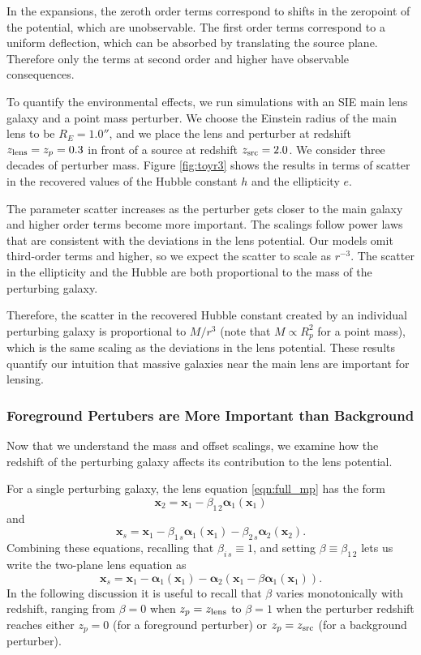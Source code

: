 \documentclass{emulateapj}
\newcommand\x[0]{\mathbf{x}}
\newcommand\al[0]{\boldsymbol{\alpha}}
\begin{document}
In the expansions, the zeroth order terms correspond to shifts in the zeropoint of the potential, which are unobservable.  The first order terms correspond to a uniform deflection, which can be absorbed by translating the source plane.  Therefore only the terms at second order and higher have observable consequences.

To quantify the environmental effects, we run simulations with an SIE main lens galaxy and a point mass perturber.  We choose the Einstein radius of the main lens to be $R_E = 1.0''$, and we place the lens and perturber at redshift $z_{\rm{lens}} = z_p = 0.3$ in front of a source at redshift $z_{\rm{src}} = 2.0$.  We consider three decades of perturber mass.  Figure \ref{fig:toyr3} shows the results in terms of scatter in the recovered values of the Hubble constant $h$ and the ellipticity $e$.

The parameter scatter increases as the perturber gets closer to the main galaxy and higher order terms become more important.  The scalings follow power laws that are consistent with the deviations in the lens potential. Our models omit third-order terms and higher, so we expect the scatter to scale as $r^{-3}$. The scatter in the ellipticity and the Hubble are both proportional to the mass of the perturbing galaxy. 

Therefore, the scatter in the recovered Hubble constant created by an individual perturbing galaxy is proportional to $M / r^3$ (note that $ M \propto R_p^2$ for a point mass), which is the same scaling as the deviations in the lens potential. These results quantify our intuition that massive galaxies near the main lens are important for lensing.


\subsubsection{Foreground Pertubers are More Important than Background}
\label{sec:frontback}

Now that we understand the mass and offset scalings, we examine how the redshift of the perturbing galaxy affects its contribution to the lens potential. 

For a single perturbing galaxy, the lens equation \ref{eqn:full_mp} has the form
\begin{equation}
\x_2 = \x_1 - \beta_{1\,2} \al_1(\x_1)
\end{equation}
and
\begin{equation}
\x_s = \x_1 - \beta_{1\,s} \al_1(\x_1) - \beta_{2\,s} \al_2(\x_2).
\end{equation}
Combining these equations, recalling that $\beta_{i\,s} \equiv 1$, and setting $\beta \equiv \beta_{1\,2}$ lets us write the two-plane lens equation as
\begin{equation}
\x_s = \x_1 - \al_1(\x_1) - \al_2\left(\x_1 - \beta \al_1(\x_1)\right).
\label{eqn:twoplane}
\end{equation}
In the following discussion it is useful to recall that $\beta$ varies monotonically with redshift, ranging from $\beta = 0$ when $z_p = z_{\rm{lens}}$ to $\beta = 1$ when the perturber redshift reaches either $z_p = 0$ (for a foreground perturber) or $z_p = z_{\rm{src}}$ (for a background perturber).
\end{document}
